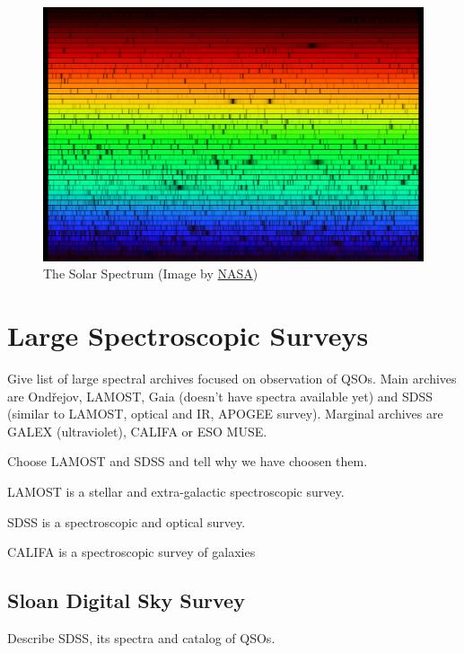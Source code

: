 \documentclass[thesis=M,english]{FITthesis}[2012/10/20]
\begin{document}
\begin{figure}
	\includegraphics[width=\textwidth]{img/solarspectrum.jpg}
	\caption{The Solar Spectrum (Image by \href{https://solarsystem.nasa.gov/resources/390/the-solar-spectrum/}{NASA})}
	\label{solar_spectrum}
\end{figure}

\section{Large Spectroscopic Surveys}

Give list of large spectral archives focused on observation of QSOs.
Main archives are Ondřejov, LAMOST, Gaia (doesn't have spectra available yet)
and SDSS (similar to LAMOST, optical and IR, APOGEE survey).
Marginal archives are GALEX (ultraviolet), CALIFA or ESO MUSE.

Choose LAMOST and SDSS and tell why we have choosen them.

LAMOST is a stellar and extra-galactic spectroscopic survey.

SDSS is a spectroscopic and optical survey.

CALIFA is a spectroscopic survey of galaxies

\subsection{Sloan Digital Sky Survey}

Describe SDSS, its spectra and catalog of QSOs.
\end{document}
